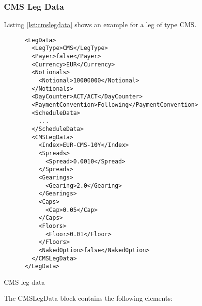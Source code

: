\subsubsection{CMS Leg Data}
\label{ss:cmslegdata}

Listing \ref{lst:cmslegdata} shows an example for a leg of type CMS. 

\begin{listing}[H]
\begin{verbatim}
      <LegData>
        <LegType>CMS</LegType>
        <Payer>false</Payer>
        <Currency>EUR</Currency>
        <Notionals>
          <Notional>10000000</Notional>
        </Notionals>
        <DayCounter>ACT/ACT</DayCounter>
        <PaymentConvention>Following</PaymentConvention>
        <ScheduleData>
          ...
        </ScheduleData>
        <CMSLegData>
          <Index>EUR-CMS-10Y</Index>
          <Spreads>
            <Spread>0.0010</Spread>
          </Spreads>
          <Gearings>
            <Gearing>2.0</Gearing>
          </Gearings>
          <Caps>
            <Cap>0.05</Cap>
          </Caps>
          <Floors>
            <Floor>0.01</Floor>
          </Floors>
          <NakedOption>false</NakedOption>
        </CMSLegData>
      </LegData>
\end{verbatim}
\caption{CMS leg data}
\label{lst:cmslegdata}
\end{listing}

The CMSLegData block contains the following elements:


